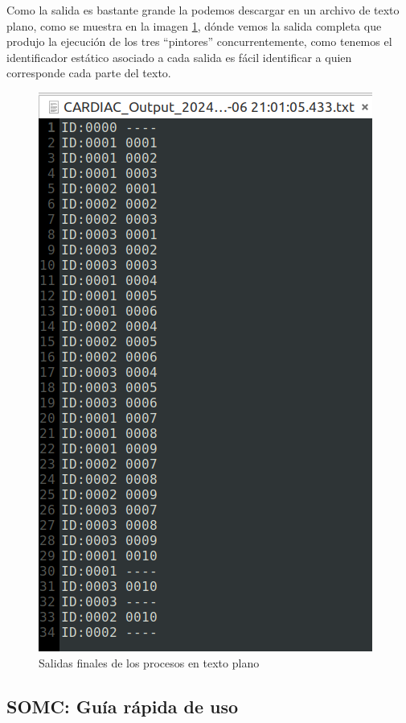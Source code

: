 \documentclass[letterpaper,12pt,oneside]{book}
\begin{document}
		Como la salida es bastante grande la podemos descargar en un archivo de texto plano, como se muestra en la imagen \ref{fig:Salida3Procesos}, dónde
		vemos la salida completa que produjo la ejecución de los tres ``pintores'' concurrentemente, como tenemos el identificador estático asociado
		a cada salida es fácil identificar a quien corresponde cada parte del texto.
		
		
		\begin{figure}[h]		
			\centering
			\includegraphics[scale=0.5]{media/CARDIACC/Salida3Procesos.png}
			\caption{ Salidas finales de los procesos en texto plano}
			\label{fig:Salida3Procesos}
		\end{figure}

		\clearpage
		
		\subsection{SOMC: Guía rápida de uso}
		
\end{document}
